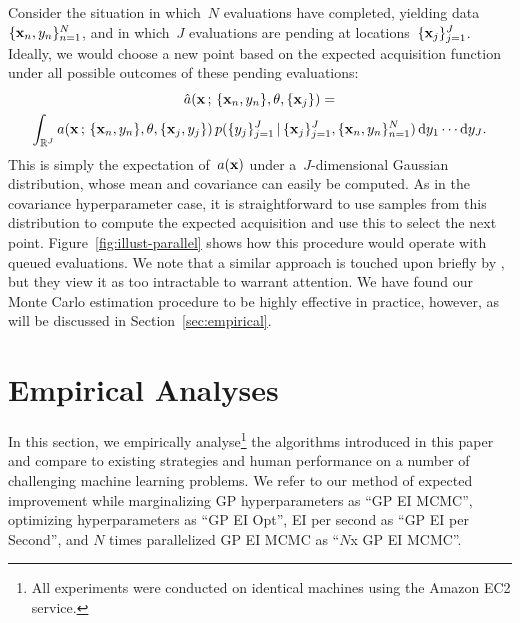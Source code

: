 \documentclass[aos,preprint]{imsart}
\begin{document}
Consider the situation in which~$N$ evaluations have completed,
yielding data~$\{\boldsymbol{\mathrm{x}}_n,y_n\}^N_{n=1}$, and in which~$J$ evaluations
are pending at locations~$\{\boldsymbol{\mathrm{x}}_j\}^J_{j=1}$.  Ideally, we would
choose a new point based on the expected acquisition function under
all possible outcomes of these pending evaluations:
\begin{multline}
  \hat{a}(\brmx\aqhist,\{\brmx_j\}) = \\\int_{\reals^J}
  a(\brmx\aqhist,\{\brmx_j,y_j\})\,p(\{y_j\}^J_{j=1}
  \given\{\brmx_j\}^J_{j=1},\{\brmx_n,y_n\}^N_{n=1})
  \,
  \mathrm{d}y_1\cdots\mathrm{d}y_J.
\end{multline}
This is simply the expectation of~$a(\boldsymbol{\mathrm{x}})$ under a~$J$-dimensional
Gaussian distribution, whose mean and covariance can easily be
computed.  As in the covariance hyperparameter case, it is
straightforward to use samples from this distribution to compute the
expected acquisition and use this to select the next point.
Figure~\ref{fig:illust-parallel} shows how this procedure would
operate with queued evaluations.  We note that a similar approach is
touched upon briefly by \citet{Ginsbourger2010a}, but they view it as
too intractable to warrant attention.  We have found our Monte Carlo
estimation procedure to be highly effective in practice, however, as
will be discussed in Section~\ref{sec:empirical}.

\section{Empirical Analyses}
In this section, we empirically analyse\footnote{All experiments were
  conducted on identical machines using the Amazon EC2 service.} the
algorithms introduced in this paper and compare to existing strategies
and human performance on a number of challenging machine learning
problems.  We refer to our method of expected improvement while
marginalizing GP hyperparameters as ``GP EI MCMC'', optimizing
hyperparameters as ``GP EI Opt'', EI per second as ``GP EI per
Second'', and $N$ times parallelized GP EI MCMC as ``$N$x GP EI
MCMC''.

\label{sec:empirical}
\end{document}
